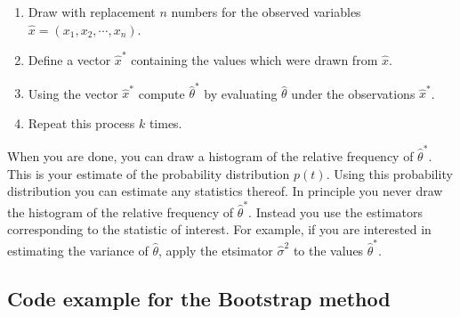 \begin{enumerate}
\item Draw with replacement $n$ numbers for the observed variables $\hat{x} = (x_1,x_2,\cdots,x_n)$. 

\item Define a vector $\hat{x}^*$ containing the values which were drawn from $\hat{x}$. 

\item Using the vector $\hat{x}^*$ compute $\widehat{\theta}^*$ by evaluating $\widehat \theta$ under the observations $\hat{x}^*$. 

\item Repeat this process $k$ times. 
\end{enumerate}

\noindent
When you are done, you can draw a histogram of the relative frequency of $\widehat \theta^*$. This is your estimate of the probability distribution $p(t)$. Using this probability distribution you can estimate any statistics thereof. In principle you never draw the histogram of the relative frequency of $\widehat{\theta}^*$. Instead you use the estimators corresponding to the statistic of interest. For example, if you are interested in estimating the variance of $\widehat \theta$, apply the etsimator $\widehat \sigma^2$ to the values $\widehat \theta ^*$.

\subsection*{Code example for the Bootstrap method}


